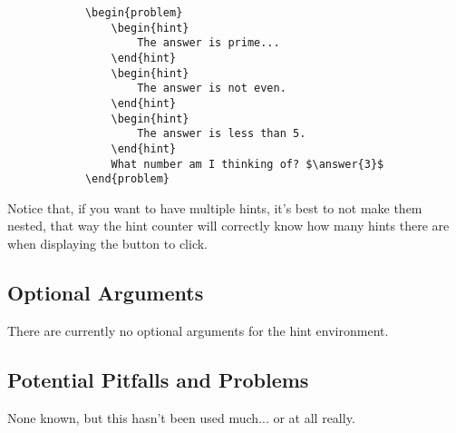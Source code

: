\documentclass{ximera}
\begin{document}
        \begin{verbatim}
            \begin{problem}
                \begin{hint}
                    The answer is prime...
                \end{hint}
                \begin{hint}
                    The answer is not even.
                \end{hint}
                \begin{hint}
                    The answer is less than 5.
                \end{hint}
                What number am I thinking of? $\answer{3}$
            \end{problem}
        \end{verbatim}
        
        Notice that, if you want to have multiple hints, it's best to not make them nested, that way the hint counter will correctly know how many hints there are when displaying the button to click.
        
        

\subsection*{Optional Arguments}
    
    There are currently no optional arguments for the hint environment.
    
\subsection*{Potential Pitfalls and Problems}
    
    None known, but this hasn't been used much... or at all really.
\end{document}
